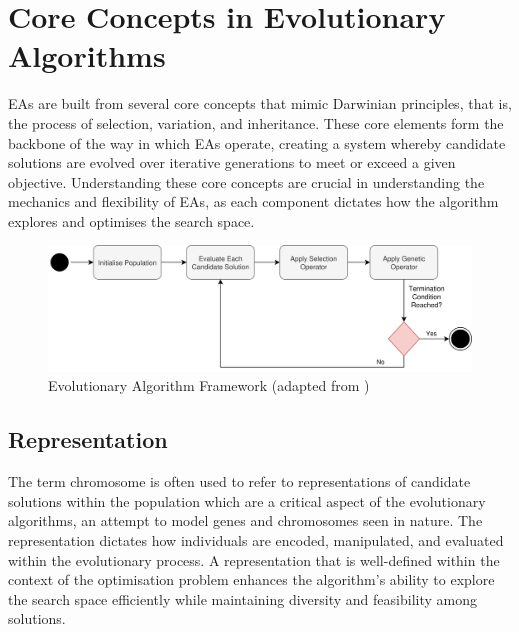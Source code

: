 \section{Core Concepts in Evolutionary Algorithms}\label{sec:ea_core_concepts}
EAs are built from several core concepts that mimic Darwinian principles, that is, the process of selection, variation, and inheritance. These core elements form the backbone of the way in which EAs operate, creating a system whereby candidate solutions are evolved over iterative generations to meet or exceed a given objective. Understanding these core concepts are crucial in understanding the mechanics and flexibility of EAs, as each component dictates how the algorithm explores and optimises the search space.

\parbreak
\begin{figure}[H] %
	\centering %
	\includegraphics[width=\textwidth]{Figures/chapter_ea/chapter_ea_ea_framework.png} %
	\caption{Evolutionary Algorithm Framework (adapted from \cite{handsOnGeneticAlgorithms})}
	\label{fig:ea_framework} %
\end{figure}

\subsection{Representation}
The term chromosome is often used to refer to representations of candidate solutions within the population which are a critical aspect of the evolutionary algorithms, an attempt to model genes and chromosomes seen in nature. The representation dictates how individuals are encoded, manipulated, and evaluated within the evolutionary process. A representation that is well-defined within the context of the optimisation problem enhances the algorithm's ability to explore the search space efficiently while maintaining diversity and feasibility among solutions.

